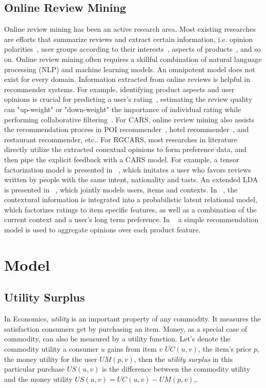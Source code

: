 \documentclass{llncs}
\begin{document}
\subsection{Online Review Mining}
Online review mining has been an active research area. Most existing researches are efforts that summarize reviews and extract certain information, i.e. opinion polarities~\cite{Liu2005Opinion}, user groups according to their interests~\cite{Si2014Users}, aspects of products~\cite{Moghaddam2013FLDA}, and so on. Online review mining often requires a skillful combination of natural language processing (NLP) and machine learning models. An omnipotent model does not exist for every domain.
Information extracted from online reviews is helpful in recommender systems. For example, identifying product aspects and user opinions is crucial for predicting a user's rating~\cite{Qu2010Bag}, estimating the review quality can "up-weight" or "down-weight" the importance of individual rating while performing collaborative filtering~\cite{Raghavan2012Review}. For CARS, online review mining also assists the recommendation process in POI recommender~\cite{Biancalana2013Approach}, hotel recommender~\cite{Levi2012Finding}, and restaurant recommender\cite{Li2010Contextual}, etc..
For RGCARS, most researches in literature directly utilize the extracted conextual opinions to form preference data, and then pipe the explicit feedback with a CARS model. For example, a tensor factorization model is presented in ~\cite{Levi2012Finding}, which imitates a user who favors reviews written by people with the same intent, nationality and tasts. An extended LDA is presented in ~\cite{Hariri2013Query}, which jointly models users, items and contexts. In ~\cite{Li2010Contextual}, the contextural information is integrated into a probabilistic latent relational model, which factorizes ratings to item specific features, as well as a combination of the current context and a user's long term preference. In ~\cite{Liu2013Combining} a simple recommendation model is used to aggregate opinions over each product feature.


\section{ Model}\label{sec:mnar}
\subsection{Utility Surplus}
In Economics, {\em utility} is an important property of any commodity. It measures the satisfaction consumers get by purchasing an item. Money, as a special case of commodity, can also be measured by a utility function. Let's denote the commodity utility a consumer $u$ gains from item $v$ $UC(u,v)$, the item's price $p$, the money utility for the user $UM(p,v)$,  then the {\em utility surplus} in this particular purchase $US(u,v)$ is the difference between the commodity utility and the money utility  $US(u,v)=UC(u,v)-UM(p,v)$,.
\end{document}
